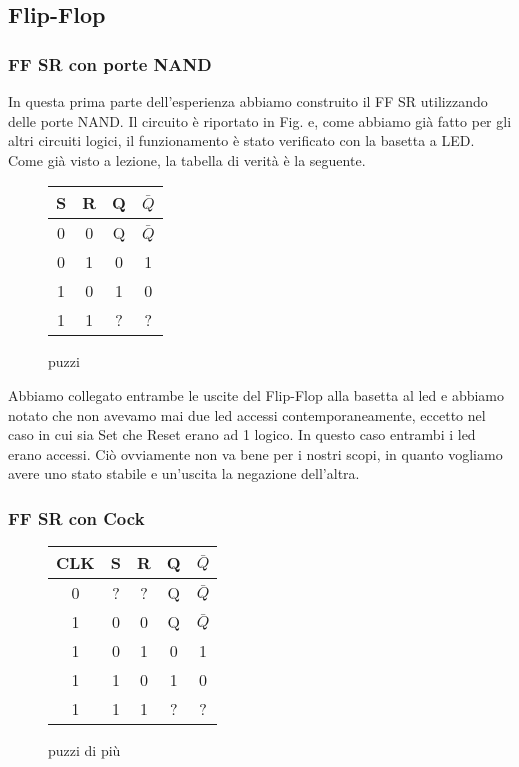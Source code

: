 \subsection{Flip-Flop}

\subsubsection*{FF SR con porte NAND}

In questa prima parte dell'esperienza abbiamo construito il FF SR utilizzando delle porte NAND. Il circuito è riportato in Fig. e, come abbiamo già fatto per gli altri circuiti logici, il funzionamento è stato verificato con la basetta a LED. Come già visto a lezione, la tabella di verità è la seguente. 

\begin{figure}[H]
		\centering
		{\renewcommand{\arraystretch}{1.1}%
		\begin{tabular}{c|c|c|c}
		
		S & R & Q & $\bar Q$ \\
		\hline
		0 & 0 & Q & $\bar Q$\\
		\hline
		0 & 1 & 0 &1\\
		\hline
		1 & 0 & 1 & 0\\
		\hline
		1 & 1 & ? & ?\\
		\end{tabular}}
		\label{tab11:FFSR}
		\caption{puzzi}
        \end{figure}


Abbiamo collegato entrambe le uscite del Flip-Flop alla basetta al led e abbiamo notato che non avevamo mai due led accessi contemporaneamente, eccetto nel caso in cui sia Set che Reset erano ad 1 logico. In questo caso entrambi i led erano accessi. Ciò ovviamente non va bene per i nostri scopi, in quanto vogliamo avere uno stato stabile e un'uscita la negazione dell'altra. 


\subsubsection*{FF SR con Cock}






\begin{figure}[H]
		\centering
		{\renewcommand{\arraystretch}{1.1}%
		\begin{tabular}{c|c|c|c|c}
		CLK & S & R & Q & $\bar Q$ \\
		\hline		
		0 & ? & ? & Q & $\bar Q$\\
		\hline
		 1&0 & 0 & Q & $\bar Q$\\
		\hline
		1&0 & 1 & 0 &1\\
		\hline
		1&1 & 0 & 1 & 0\\
		\hline
		1&1 & 1 & ? & ?\\
		\end{tabular}}
		\label{tab11:FFSR}
		\caption{puzzi di più}
        \end{figure}






